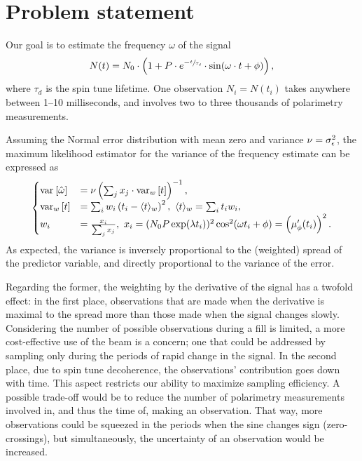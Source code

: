 \documentclass{article}
\begin{document}
	
\section*{Problem statement}

Our goal is to estimate the frequency $\omega$ of the signal
\begin{equation}
	N(t) = N_0\cdot\bkt{1 + P\cdot e^{-\sfrac{t}{\tau_d}}\cdot\sin(\omega\cdot t + \phi)},
\end{equation}
where $\tau_d$ is the spin tune lifetime. One observation $N_i = N(t_i)$ takes anywhere between 1--10 milliseconds, and involves two to three thousands of polarimetry measurements.

Assuming the Normal error distribution with mean zero and variance $\nu = \SD{\obs}^2$, the maximum likelihood estimator for the variance of the frequency estimate can be expressed as
\begin{equation}\label{eq:SEFreqEst}
\begin{cases}
\var{\hat\omega} &= \nu\bkt{\sum_j x_j\cdot \var[w]{t}}^{-1}, \\
\var[w]{t} &= \sum_i w_i \bkt{t_i - \avg{t}_w}^2,~ \avg{t}_w = \sum_i t_i w_i, \\
w_i &= \frac{x_i}{\sum_j x_j},~ x_i = (N_0P\exp(\lambda t_i))^2\cos^2(\omega t_i + \phi) = \bkt{\mupp}^2.
\end{cases}	
\end{equation}
As expected, the variance is inversely proportional to the (weighted) spread of the predictor variable,
and directly proportional to the variance of the error. 

Regarding the former, the weighting by the derivative of the signal has a twofold effect: in the first place, observations that are made when the derivative is maximal to the spread more than those made when the signal changes slowly. Considering the number of possible observations during a fill is limited, a more cost-effective use of the beam is a concern; one that could be addressed by sampling only during the periods of rapid change in the signal. In the second place, due to spin tune decoherence, the observations' contribution goes down with time. This aspect restricts our ability to maximize sampling efficiency. A possible trade-off would be to reduce the number of polarimetry measurements involved in, and thus the time of, making an observation. That way, more observations could be squeezed in the periods when the sine changes sign (zero-crossings), but simultaneously, the uncertainty of an observation would be increased. 
\end{document}
